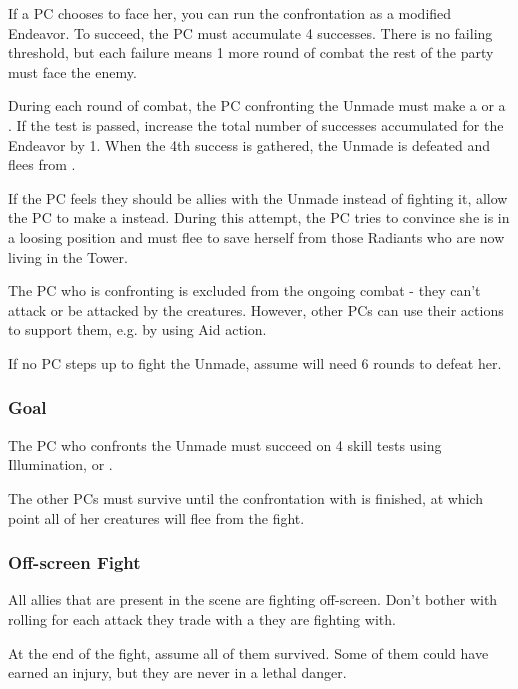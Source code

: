 If a PC chooses to face her, you can run the confrontation as a modified Endeavor. To succeed, the PC must accumulate 4 successes. There is no failing threshold, but each failure means 1 more round of combat the rest of the party must face the enemy.

During each round of combat, the PC confronting the Unmade must make a  or a . If the test is passed, increase the total number of successes accumulated for the Endeavor by 1. When the 4th success is gathered, the Unmade is defeated and flees from \locationUrithiru{}.

If the PC feels they should be allies with the Unmade instead of fighting it, allow the PC to make a  instead. During this attempt, the PC tries to convince \npcMidnightMother{} she is in a loosing position and must flee to save herself from those Radiants who are now living in the Tower.

The PC who is confronting \npcMidnightMother{} is excluded from the ongoing combat - they can't attack or be attacked by the creatures. However, other PCs can use their actions to support them, e.g. by using Aid action.

If no PC steps up to fight the Unmade, assume \npcShallan{} will need 6 rounds to defeat her.


\subsubsection{Goal}

The PC who confronts the Unmade must succeed on 4 skill tests using Illumination, \skillIntimiation{} or \skillPersuasion{}.

The other PCs must survive until the confrontation with \npcMidnightMother{} is finished, at which point all of her creatures will flee from the fight.

\subsubsection{Off-screen Fight}

All allies that are present in the scene are fighting off-screen. Don't bother with rolling for each attack they trade with a \enemyMidnightAssassin{} they are fighting with.

At the end of the fight, assume all of them survived. Some of them could have earned an injury, but they are never in a lethal danger.

